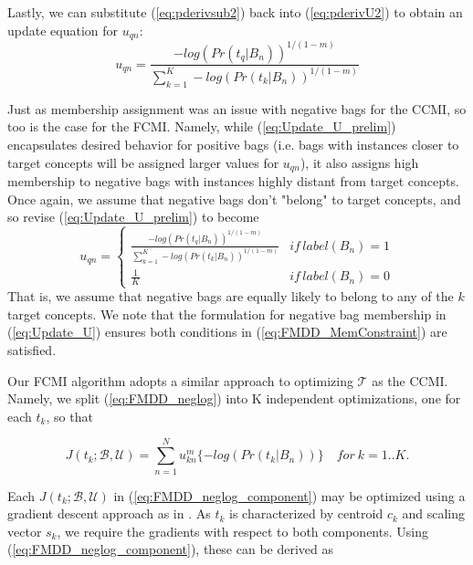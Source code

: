 \documentclass[12pt,dvips]{report}
\numberwithin{equation}{section}
\begin{document}
Lastly, we can substitute (\ref{eq:pderivsub2}) back into (\ref{eq:pderivU2}) to obtain an update equation for $u_{qn}$:
\begin{equation} \label{eq:Update_U_prelim}
u_{qn}=  \frac{-log(Pr(t_q \vert  B_n))^{1/(1-m)}}{\sum_{k=1}^{K} -log(Pr(t_k \vert  B_n))^{1/(1-m)} }
 \end{equation}

Just as membership assignment was an issue with negative bags for the CCMI, so too is the case for the FCMI.  Namely, while (\ref{eq:Update_U_prelim}) encapsulates desired behavior for positive bags (i.e. bags with instances closer to target concepts will be assigned larger values for $u_{qn}$), it also assigns high membership to negative bags with instances highly distant from target concepts.  Once again, we assume that negative bags don't "belong" to target concepts, and so revise (\ref{eq:Update_U_prelim}) to become
\begin{equation} \label{eq:Update_U}
u_{qn} = \begin{cases} 
\frac{-log(Pr(t_q \vert  B_n))^{1/(1-m)}}{\sum_{k=1}^{K} -log(Pr(t_k \vert  B_n))^{1/(1-m)} }	& if \, label(B_{n})\!\!=\!\!1\\
\frac{1}{K} & if \, label(B_{n})\!\!=\!\!0
\end{cases}
 \end{equation} That is, we assume that negative bags are equally likely to belong to any of the $k$ target concepts.  We note that the formulation for negative bag membership in (\ref{eq:Update_U}) ensures both conditions in (\ref{eq:FMDD_MemConstraint}) are satisfied.

Our FCMI algorithm adopts a similar approach to optimizing $\mathcal{T}$ as the CCMI.  Namely, we split (\ref{eq:FMDD_neglog}) into K independent optimizations, one for each $t_{k}$, so that

\begin{equation}  \label{eq:FMDD_neglog_component}
J(t_{k} ; \mathcal{B},\mathcal{U})  = \sum_{n=1}^{N}u_{kn}^{m} \{-log(Pr(t_{k}\vert B_{n}))\} \quad for\: k=1..K.
 \end{equation}

Each $J(t_{k} ; \mathcal{B},\mathcal{U})$ in (\ref{eq:FMDD_neglog_component}) may be optimized using a gradient descent approach as in \cite{maro98}.  As $t_{k}$ is characterized by centroid $c_{k}$ and scaling vector $s_{k}$,  we require the gradients with respect to both components.  Using (\ref{eq:FMDD_neglog_component}), these can be derived as
\end{document}
